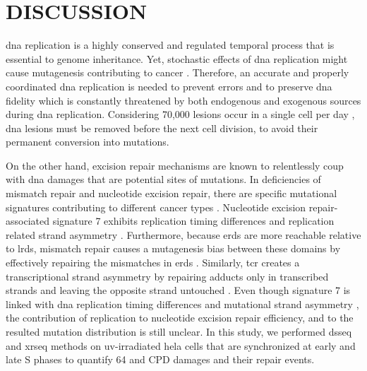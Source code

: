 \setlength{\parindent}{0pt}
\chapter{\bf DISCUSSION}

\gls{dna} replication is a highly conserved and regulated temporal process that is essential to genome inheritance. Yet, stochastic effects of \gls{dna} replication might cause mutagenesis contributing to cancer \citep{tomasetti2015variation}. Therefore, an accurate and properly coordinated \gls{dna} replication is needed to prevent errors and to preserve \gls{dna} fidelity which is constantly threatened by both endogenous and exogenous sources during \gls{dna} replication. Considering 70,000 lesions occur in a single cell per day \citep{lindahl2000repair}, \gls{dna} lesions must be removed before the next cell division, to avoid their permanent conversion into mutations. 

On the other hand, excision repair mechanisms are known to relentlessly coup with \gls{dna} damages that are potential sites of mutations. In deficiencies of mismatch repair and nucleotide excision repair, there are specific mutational signatures contributing to different cancer types \citep{helleday2014mechanisms}. Nucleotide excision repair-associated signature 7 exhibits replication timing differences and replication related strand asymmetry \citep{tomkova2018mutational}. Furthermore, because \gls{erd}s are more reachable relative to \gls{lrd}s, mismatch repair causes a mutagenesis bias between these domains by effectively repairing the mismatches in \gls{erd}s \citep{supek2015differential}. Similarly, \gls{tcr} creates a transcriptional strand asymmetry by repairing adducts only in transcribed strands and leaving the opposite strand untouched \citep{zheng2014transcription}. Even though signature 7 is linked with \gls{dna} replication timing differences and mutational strand asymmetry \citep{tomkova2018mutational}, the contribution of replication to nucleotide excision repair efficiency, and to the resulted mutation distribution is still unclear. In this study, we performed \gls{dsseq} and \gls{xrseq} methods on \gls{uv}-irradiated \gls{hela} cells that are synchronized at early and late S phases to quantify \gls{64} and \gls{CPD} damages and their repair events. 

